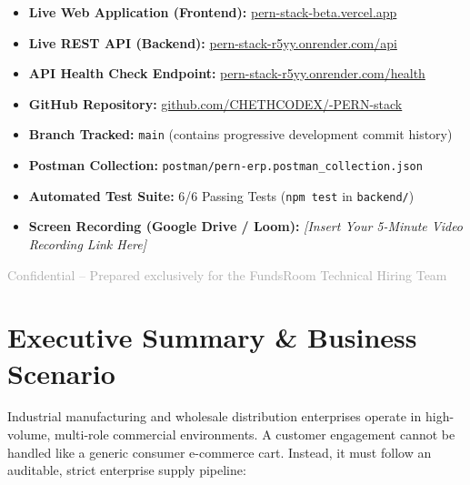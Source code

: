\documentclass[11pt,a4paper]{article}
\begin{document}
\begin{titlepage}
    \begin{tcolorbox}[colback=white,colframe=bordercolor,arc=2mm,width=0.94\textwidth,title=\textbf{\textcolor{secondary}{Official Submission Credentials \& Live Deployment Links}}]
        \small
        \begin{itemize}[leftmargin=1.5em, itemsep=0.35em]
            \item \textbf{Live Web Application (Frontend):} \href{https://pern-stack-beta.vercel.app}{pern-stack-beta.vercel.app}
            \item \textbf{Live REST API (Backend):} \href{https://pern-stack-r5yy.onrender.com/api}{pern-stack-r5yy.onrender.com/api}
            \item \textbf{API Health Check Endpoint:} \href{https://pern-stack-r5yy.onrender.com/health}{pern-stack-r5yy.onrender.com/health}
            \item \textbf{GitHub Repository:} \href{https://github.com/CHETHCODEX/-PERN-stack}{github.com/CHETHCODEX/-PERN-stack}
            \item \textbf{Branch Tracked:} \texttt{main} (contains progressive development commit history)
            \item \textbf{Postman Collection:} \texttt{postman/pern-erp.postman\_collection.json}
            \item \textbf{Automated Test Suite:} 6/6 Passing Tests (\texttt{npm test} in \texttt{backend/})
            \item \textbf{Screen Recording (Google Drive / Loom):} \textit{[Insert Your 5-Minute Video Recording Link Here]}
        \end{itemize}
    \end{tcolorbox}
    
    \vfill
    {\footnotesize \textcolor{darkgray}{Confidential -- Prepared exclusively for the FundsRoom Technical Hiring Team}}
\end{titlepage}

\newpage
\tableofcontents
\newpage

\section{Executive Summary \& Business Scenario}

Industrial manufacturing and wholesale distribution enterprises operate in high-volume, multi-role commercial environments. A customer engagement cannot be handled like a generic consumer e-commerce cart. Instead, it must follow an auditable, strict enterprise supply pipeline:
\end{document}
